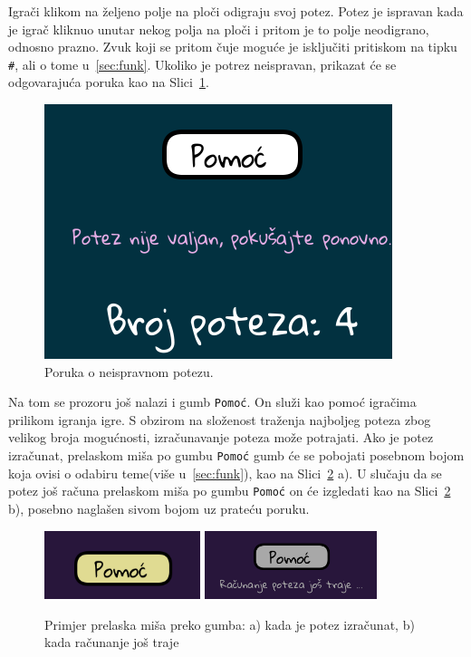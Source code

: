 \documentclass[12pt]{scrartcl}
\begin{document}
Igrači klikom na željeno polje na ploči odigraju svoj potez. Potez je ispravan kada je igrač kliknuo unutar nekog polja na ploči i pritom je to polje neodigrano, odnosno prazno. Zvuk koji se pritom čuje moguće je isključiti pritiskom na tipku \texttt{\#}, ali o tome u~\ref{sec:funk}. Ukoliko je potrez neispravan, prikazat će se odgovarajuća poruka kao na Slici~\ref{fig:poruka}.

\begin{figure}[h]
	\centering
	\includegraphics[scale=0.5]{poruka.png}
	\caption{Poruka o neispravnom potezu.}
	\label{fig:poruka}
\end{figure}

Na tom se prozoru još nalazi i gumb \texttt{Pomoć}. On služi kao pomoć igračima prilikom igranja igre. S obzirom na složenost traženja najboljeg poteza zbog velikog broja mogućnosti, izračunavanje poteza može potrajati. Ako je potez izračunat, prelaskom miša po gumbu \texttt{Pomoć} gumb će se pobojati posebnom bojom koja ovisi o odabiru teme(više u~\ref{sec:funk}), kao na Slici~\ref{fig:pom} a). U slučaju da se potez još računa prelaskom miša po gumbu \texttt{Pomoć} on će izgledati kao na Slici~\ref{fig:pom} b), posebno naglašen sivom bojom uz prateću poruku.

\begin{figure}[h]
	\centering
	\includegraphics[height=2cm]{pomoc.png}
	\includegraphics[height=2cm]{pomoc-racunanje.png}
	\caption{Primjer prelaska miša preko gumba: \newline a) kada je potez izračunat, b) kada računanje još traje}
	\label{fig:pom}
\end{figure}
\end{document}
